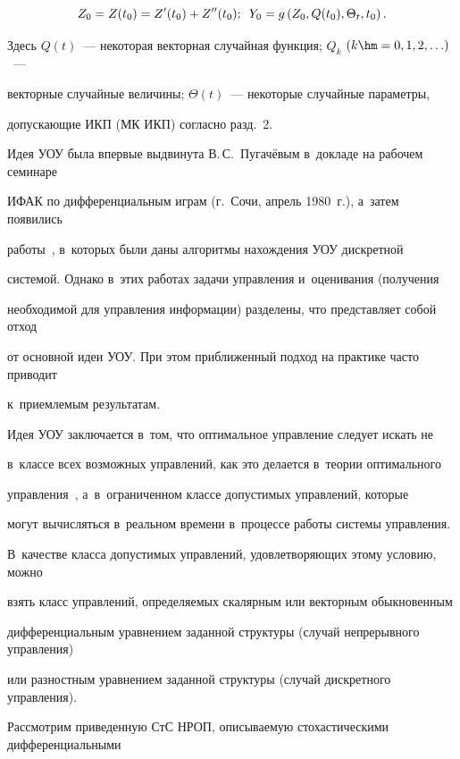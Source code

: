 \begin{equation*}

Z_0 = Z(t_0) = Z'(t_0) + Z''(t_0); \enskip Y_0 =g\left(Z_0, Q(t_0),\Theta_t, t_0\right).

\end{equation*}

Здесь $Q(t)$~--- некоторая векторная случайная функция; $Q_k$ $(k\hm=0,1,2,\ldots)$~--- 

векторные случайные величины; $\Theta(t)$~--- некоторые случайные параметры, 

допускающие ИКП (МК ИКП) согласно разд.~2.



Идея УОУ была впервые выдвинута В.\,С.~Пугачёвым в~докладе на рабочем семинаре 

ИФАК по дифференциальным играм (г.~Сочи, апрель 1980~г.), а~затем  появились 

работы~\cite{5-sin, 6-sin, 7-sin, 8-sin, 9-sin, 10-sin},  в~которых были даны алгоритмы нахождения УОУ дискретной 

системой. Однако в~этих работах задачи управления и~оценивания (получения 

необходимой для управ\-ле\-ния информации) разделены, что пред\-став\-ля\-ет собой отход 

от основной идеи УОУ.  При этом приближенный подход на практике часто приводит 

к~приемлемым результатам.



Идея УОУ заключается в~том, что оптимальное управление следует искать не 

в~классе всех возможных управ\-ле\-ний, как это делается в~тео\-рии оптимального 

управления~\cite{13-sin, 14-sin}, а~в~ограниченном классе допустимых управ\-ле\-ний, которые 

могут вычисляться в~реальном времени в~процессе работы системы управления. 

В~качестве класса допустимых управлений, удовлетворяющих этому условию, можно 

взять класс управлений, определяемых скалярным или векторным обыкновенным 

дифференциальным уравнением заданной структуры (случай непрерывного управ\-ле\-ния) 

или разностным уравнением заданной структуры (случай дискретного управ\-ле\-ния).



Рассмотрим приведенную СтС НРОП, описываемую стохастическими дифференциальными 

